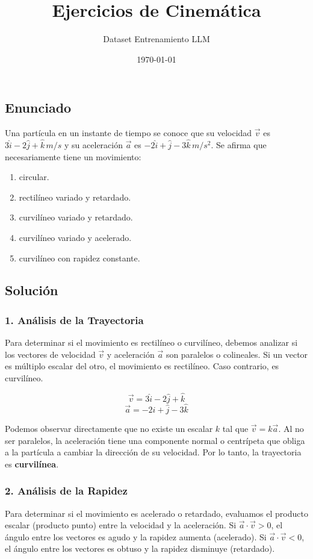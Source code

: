 \documentclass[12pt, a4paper]{article}
\title{Ejercicios de Cinemática}
\author{Dataset Entrenamiento LLM}
\date{\today}
\begin{document}
\maketitle

\subsection*{Enunciado}
Una partícula en un instante de tiempo se conoce que su velocidad $\vec{v}$ es $3\hat{i} - 2\hat{j} + \hat{k} \, \si{m/s}$ y su aceleración $\vec{a}$ es $-2\hat{i} + \hat{j} - 3\hat{k} \, \si{m/s^2}$. Se afirma que necesariamente tiene un movimiento:
\begin{enumerate}[label=\alph*)]
    \item circular.
    \item rectilíneo variado y retardado.
    \item curvilíneo variado y retardado.
    \item curvilíneo variado y acelerado.
    \item curvilíneo con rapidez constante.
\end{enumerate}

\subsection*{Solución}

\subsubsection*{1. Análisis de la Trayectoria}
Para determinar si el movimiento es rectilíneo o curvilíneo, debemos analizar si los vectores de velocidad $\vec{v}$ y aceleración $\vec{a}$ son paralelos o colineales. Si un vector es múltiplo escalar del otro, el movimiento es rectilíneo. Caso contrario, es curvilíneo.

$$\vec{v} = 3\hat{i} - 2\hat{j} + \hat{k}$$
$$\vec{a} = -2\hat{i} + \hat{j} - 3\hat{k}$$

Podemos observar directamente que no existe un escalar $k$ tal que $\vec{v} = k\vec{a}$. Al no ser paralelos, la aceleración tiene una componente normal o centrípeta que obliga a la partícula a cambiar la dirección de su velocidad. Por lo tanto, la trayectoria es \textbf{curvilínea}.

\subsubsection*{2. Análisis de la Rapidez}
Para determinar si el movimiento es acelerado o retardado, evaluamos el producto escalar (producto punto) entre la velocidad y la aceleración.
Si $\vec{a} \cdot \vec{v} > 0$, el ángulo entre los vectores es agudo y la rapidez aumenta (acelerado).
Si $\vec{a} \cdot \vec{v} < 0$, el ángulo entre los vectores es obtuso y la rapidez disminuye (retardado).
\end{document}
